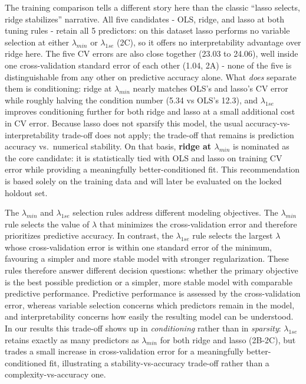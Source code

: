 \documentclass[
  11pt,
]{article}
\newcounter{none} %
\begin{document}
The training comparison tells a different story here than the classic
``lasso selects, ridge stabilizes'' narrative. All five candidates -
OLS, ridge, and lasso at both tuning rules - retain all 5 predictors: on
this dataset lasso performs no variable selection at either
\(\lambda_{min}\) or \(\lambda_{1se}\) (2C), so it offers no
interpretability advantage over ridge here. The five CV errors are also
close together (23.03 to 24.06), well inside one cross-validation
standard error of each other (1.04, 2A) - none of the five is
distinguishable from any other on predictive accuracy alone. What
\emph{does} separate them is conditioning: ridge at \(\lambda_{min}\)
nearly matches OLS's and lasso's CV error while roughly halving the
condition number (5.34 vs OLS's 12.3), and \(\lambda_{1se}\) improves
conditioning further for both ridge and lasso at a small additional cost
in CV error. Because lasso does not sparsify this model, the usual
accuracy-vs-interpretability trade-off does not apply; the trade-off
that remains is prediction accuracy vs.~numerical stability. On that
basis, \textbf{ridge at \(\lambda_{min}\)} is nominated as the core
candidate: it is statistically tied with OLS and lasso on training CV
error while providing a meaningfully better-conditioned fit. This
recommendation is based solely on the training data and will later be
evaluated on the locked holdout set.

The \(\lambda_{min}\) and \(\lambda_{1se}\) selection rules address
different modeling objectives. The \(\lambda_{min}\) rule selects the
value of \(\lambda\) that minimizes the cross-validation error and
therefore prioritizes predictive accuracy. In contrast, the
\(\lambda_{1se}\) rule selects the largest \(\lambda\) whose
cross-validation error is within one standard error of the minimum,
favouring a simpler and more stable model with stronger regularization.
These rules therefore answer different decision questions: whether the
primary objective is the best possible prediction or a simpler, more
stable model with comparable predictive performance. Predictive
performance is assessed by the cross-validation error, whereas variable
selection concerns which predictors remain in the model, and
interpretability concerns how easily the resulting model can be
understood. In our results this trade-off shows up in
\emph{conditioning} rather than in \emph{sparsity}: \(\lambda_{1se}\)
retains exactly as many predictors as \(\lambda_{min}\) for both ridge
and lasso (2B-2C), but trades a small increase in cross-validation error
for a meaningfully better-conditioned fit, illustrating a
stability-vs-accuracy trade-off rather than a complexity-vs-accuracy
one.
\end{document}
